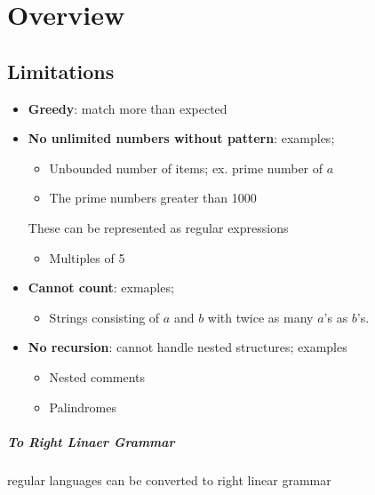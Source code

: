 \chapter{Overview}

\section{Limitations}

  \begin{itemize}
    \item \textbf{Greedy}: match more than expected
    \item \textbf{No unlimited numbers without pattern}: examples;
    \begin{itemize}
      \item Unbounded number of items; ex. prime number of $ a $
      \item The prime numbers greater than 1000
    \end{itemize}

    These can be represented as regular expressions

    \begin{itemize}
      \item Multiples of 5
    \end{itemize}

    \item \textbf{Cannot count}: exmaples;
    \begin{itemize}
      \item Strings consisting of $ a $ and $ b $ with twice as many $ a $'s
      as $ b $'s.
    \end{itemize}

    \item \textbf{No recursion}: cannot handle nested structures; examples
    \begin{itemize}
      \item Nested comments
      \item Palindromes
    \end{itemize}
  \end{itemize}

  \paragraph{To Right Linaer Grammar} regular languages can be converted to
  right linear grammar
